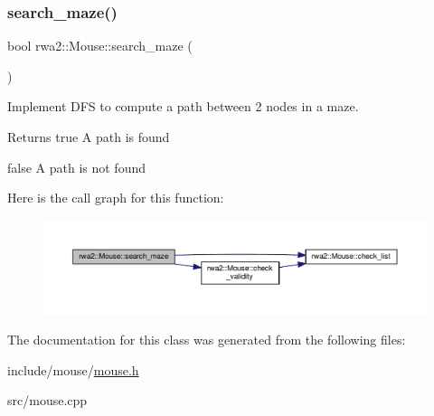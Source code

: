 \subsubsection{\texorpdfstring{search\+\_\+maze()}{search\_maze()}}
{\footnotesize\ttfamily bool rwa2\+::\+Mouse\+::search\+\_\+maze (\begin{DoxyParamCaption}{ }\end{DoxyParamCaption})}



Implement D\+FS to compute a path between 2 nodes in a maze. 

\begin{DoxyReturn}{Returns}
true A path is found 

false A path is not found 
\end{DoxyReturn}
Here is the call graph for this function\+:\nopagebreak
\begin{figure}[H]
\begin{center}
\leavevmode
\includegraphics[width=350pt]{classrwa2_1_1_mouse_a789be287a432bafc903c97396a014d7d_cgraph}
\end{center}
\end{figure}


The documentation for this class was generated from the following files\+:\begin{DoxyCompactItemize}
\item 
include/mouse/\hyperlink{mouse_8h}{mouse.\+h}\item 
src/mouse.\+cpp\end{DoxyCompactItemize}
